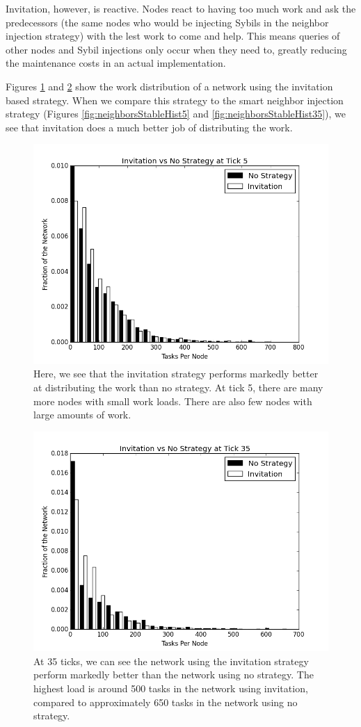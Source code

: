 Invitation, however, is reactive.
Nodes react to having too much work and ask the predecessors (the same nodes who would be injecting Sybils in the neighbor injection strategy) with the lest work to come and help.
This means queries of other nodes and Sybil injections only occur when they need to, greatly reducing the maintenance costs in an actual implementation.


Figures \ref{fig:inviteStableHist5} and \ref{fig:inviteStableHist35} show the work distribution of a network using the invitation based strategy.
When we compare this strategy to the smart neighbor injection strategy (Figures \ref{fig:neighborsStableHist5} and \ref{fig:neighborsStableHist35}), we see that invitation does a much better job of distributing the work.

\begin{figure}
\centering
\includegraphics[width=0.7\linewidth]{figs/inviteStableHist5}
\caption[Invitiation vs no strategy after 5 ticks]{Here, we see that the invitation strategy performs markedly better at distributing the work than no strategy.  At tick 5, there are many more nodes with small work loads.  There are also few nodes with large amounts of work.}
\label{fig:inviteStableHist5}
\end{figure}

\begin{figure}
	\centering
	\includegraphics[width=0.7\linewidth]{figs/inviteStableHist35}
	\caption[Invitiation vs no strategy after 35 ticks]{At 35 ticks, we can see the network using the invitation strategy perform markedly better than the network using no strategy. The highest load is around 500 tasks in the network using invitation, compared to approximately 650 tasks in the network using no strategy.}
\label{fig:inviteStableHist35}
\end{figure}



